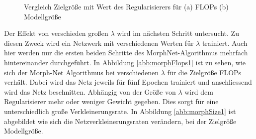 \begin{figure}
     \centering
     \hfill
     \caption{Vergleich Zielgröße mit Wert des Regularisierers für (a) FLOPs (b) Modellgröße }
     \label{abb:morph1}
\end{figure}

Der Effekt von verschieden großen $\lambda$ wird im nächsten Schritt untersucht. Zu diesen Zweck wird ein Netzwerk mit verschiedenen Werten für $\lambda$ trainiert. Auch hier werden nur die ersten beiden Schritte des MorphNet-Algorithmus mehrfach hintereinander durchgeführt. In Abbildung \ref{abb:morphFlops1} ist zu sehen, wie sich der Morph-Net Algorithmus bei verschiedenen $\lambda$ für die Zielgröße FLOPs verhält. Dabei wird das Netz jeweils für fünf Epochen trainiert und anschliessend wird das Netz beschnitten. Abhängig von der Größe von $\lambda$ wird dem Regularisierer mehr oder weniger Gewicht gegeben. Dies sorgt für eine unterschiedlich große Verkleinerungsrate. In Abbildung \ref{abb:morphSize1} ist abgebildet wie sich die Netzverkleinerungsraten verändern, bei der Zielgröße Modellgröße.  

